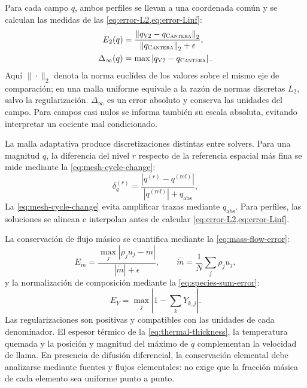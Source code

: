 \documentclass[12pt,a4paper,twoside,openany]{book}
\newcommand{\norm}[1]{\left\lVert #1\right\rVert}
\newcommand{\abs}[1]{\left\lvert #1\right\rvert}
\newcommand{\Vdos}{\textsc{V2}\xspace}
\newcommand{\Cantera}{\textsc{Cantera}\xspace}
\begin{document}
Para cada campo \(q\), ambos perfiles se llevan a una coordenada común y se
calculan las medidas de las \cref{eq:error-L2,eq:error-Linf}:
\begin{align}
  E_2(q)&=\frac{\norm{q_{\Vdos}-q_{\Cantera}}_2}
  {\norm{q_{\Cantera}}_2+\epsilon},
  \label{eq:error-L2}\\
  \Delta_\infty(q)&=\max\abs{q_{\Vdos}-q_{\Cantera}}.
  \label{eq:error-Linf}
\end{align}
Aquí \(\|\cdot\|_2\) denota la norma euclídea de los valores sobre el
mismo eje de comparación; en una malla uniforme equivale a la razón de normas
discretas \(L_2\), salvo la regularización. \(\Delta_\infty\) es un error
absoluto y conserva las unidades del campo. Para campos casi nulos se informa
también su escala absoluta, evitando interpretar un cociente mal condicionado.

La malla adaptativa produce discretizaciones distintas entre solvers. Para una
magnitud \(q\), la diferencia del nivel \(r\) respecto de la referencia espacial
más fina se mide mediante la \cref{eq:mesh-cycle-change}:
\begin{equation}
  \delta_q^{(r)}=
  \frac{\abs{q^{(r)}-q^{(\mathrm{ref})}}}
  {\abs{q^{(\mathrm{ref})}}+q_{\mathrm{abs}}},
  \label{eq:mesh-cycle-change}
\end{equation}
La \cref{eq:mesh-cycle-change} evita amplificar trazas mediante
\(q_{\mathrm{abs}}\). Para perfiles, las soluciones se alinean e interpolan
antes de calcular \cref{eq:error-L2,eq:error-Linf}.

La conservación de flujo másico se cuantifica mediante la \cref{eq:mass-flow-error}:
\begin{equation}
  E_m=\frac{\max_j\abs{\rho_j u_j-\overline{\dot m}}}
  {\abs{\overline{\dot m}}+\epsilon},
  \qquad
  \overline{\dot m}=\frac{1}{N}\sum_j\rho_j u_j,
  \label{eq:mass-flow-error}
\end{equation}
y la normalización de composición mediante la \cref{eq:species-sum-error}:
\begin{equation}
  E_Y=\max_j\abs{1-\sum_kY_{k,j}}.
  \label{eq:species-sum-error}
\end{equation}
Las regularizaciones son positivas y compatibles con las unidades de cada
denominador. El espesor térmico de la \cref{eq:thermal-thickness}, la temperatura
quemada y la posición y magnitud del máximo de \(\dot q\) complementan la
velocidad de llama. En presencia de difusión diferencial, la conservación
elemental debe analizarse mediante fuentes y flujos elementales: no exige que
la fracción másica de cada elemento sea uniforme punto a punto.
\end{document}
